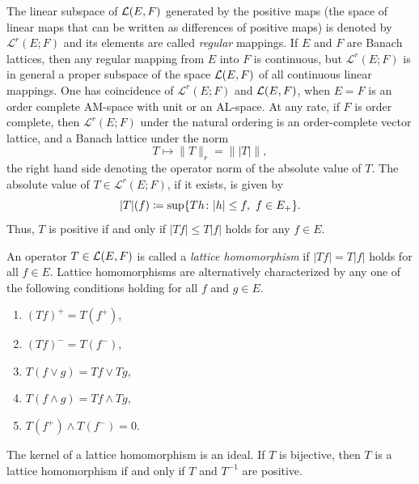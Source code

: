 The linear subspace of\/ $ \mathcal{L}(E,F) $ generated by the positive maps (\ie  the space of linear maps that can be written as differences of positive maps) is denoted by $ \mathcal{L}^{r}(E;F) $ and its elements are called \emph{regular} mappings.
If\/ $ E $ and $ F $ are Banach lattices, then any regular mapping from $ E $ into $ F $ is continuous, but  $ \mathcal{L}^{r}(E;F) $ is in general a proper subspace of the space $ \mathcal{L}(E,F) $ of all continuous linear mappings.
One has coincidence of\/ $ \mathcal{L}^{r}(E;F) $ and $ \mathcal{L}(E,F) $, \eg when $ E = F $ is an order complete AM-space with unit or an AL-space.
At any rate, if\/ $ F $ is order complete, then $ \mathcal{L}^{r}(E;F) $ under the natural ordering is an order-complete vector lattice, and a Banach lattice under the norm
\[
	T \mapsto \|T\|_{r} = \| |T| \|,
\]
the right hand side denoting the operator norm of the absolute value of\/ $ T $.
The absolute value of\/ $ T \in  \mathcal{L}^{r}(E;F) $, if it exists, is given by
\[
	|T|(f) \coloneq \sup\{ Th \colon |h| \leq f , \text{ $ f \in E_{+} $} \} . 
\]
Thus, $ T $ is positive if and only if\/ $ |Tf| \leq T|f| $ holds for any $ f \in E $.

An operator $ T \in \mathcal{L}(E,F) $ is called a \emph{lattice homomorphism} if\/ $ |Tf| = T|f| $ holds for all $ f \in E $.
Lattice homomorphisms are alternatively characterized by any one of the following conditions holding for all $ f $ and $ g \in E $.
\begin{enumerate}[\upshape (i)]

    \item 
    $(Tf)^{+} = T(f^{+})$,
    
    \item 
    $(Tf)^{-} = T(f^{-})$,
    
    \item 
    $T(f\vee g) = Tf\vee Tg$,
    
    \item 
    $T(f\wedge g) = Tf\wedge Tg$,
    
    \item 
    $T(f^{+})\wedge T(f^{-}) = 0$.

\end{enumerate}
The kernel of a lattice homomorphism is an ideal.
If\/ $ T $ is bijective, then $ T $ is a lattice homomorphism if and only if\/ $ T $ and $ T^{-1} $ are positive.
